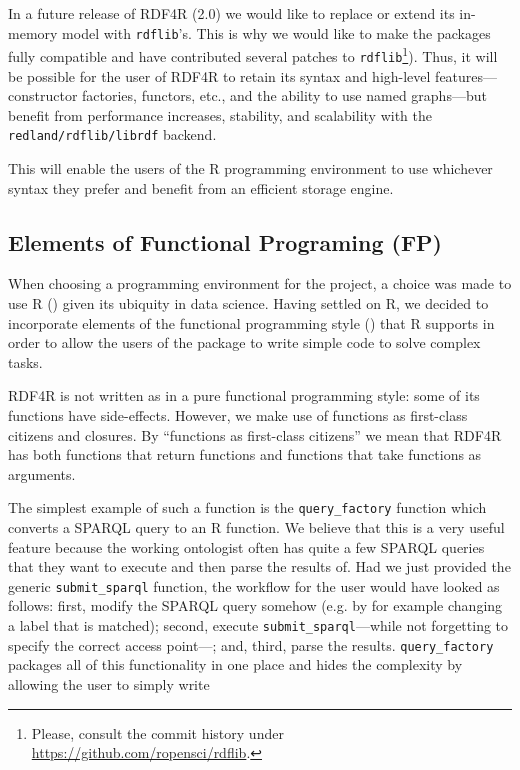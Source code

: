 In a future release of RDF4R (2.0) we would like to replace or extend its in-memory model with {\tt rdflib}'s. This is why we would like to make the packages fully compatible and have contributed several patches to {\tt rdflib}\footnote{Please, consult the commit history under \url{https://github.com/ropensci/rdflib}.}). Thus, it will be possible for the user of RDF4R to retain its syntax and high-level features--- constructor factories, functors, etc., and the ability to use named graphs---but benefit from performance increases, stability, and scalability with the {\tt redland/rdflib/librdf} backend.

This will enable the users of the R programming environment to use whichever syntax they prefer and benefit from an efficient storage engine.

\subsection{Elements of Functional Programing (FP)}

When choosing a programming environment for the project, a choice was made to use R (\cite{r_core_team_r:_2016}) given its ubiquity in data science. Having settled on R, we decided to incorporate elements of the functional programming style (\cite{wickham_advanced_2015}) that R supports in order to allow the users of the package to write simple code to solve complex tasks.

RDF4R is not written as in a pure functional programming style: some of its functions have side-effects. However, we make use of functions as first-class citizens and closures. By ``functions as first-class citizens'' we mean that RDF4R has both functions that return functions and functions that take functions as arguments.

The simplest example of such a function is the {\tt query\_factory} function which converts a SPARQL query to an R function. We believe that this is a very useful feature because the working ontologist often has quite a few SPARQL queries that they want to execute and then parse the results of. Had we just provided the generic {\tt submit\_sparql} function, the workflow for the user would have looked as follows: first, modify the SPARQL query somehow (e.g. by for example changing a label that is matched); second, execute {\tt submit\_sparql}---while not forgetting to specify the correct access point---; and, third, parse the results. {\tt query\_factory} packages all of this functionality in one place and hides the complexity by allowing the user to simply write

